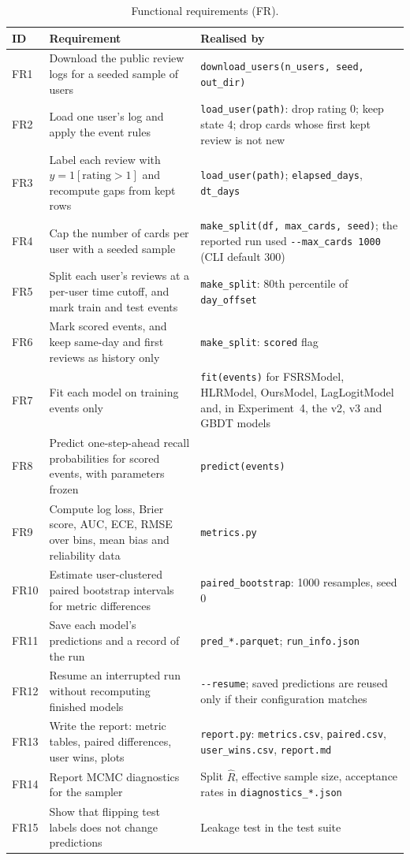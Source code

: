 \begin{table}[!htbp]
  \centering
  \caption{Functional requirements (FR).}
  \label{tab:functional}
  \footnotesize
  \begin{tabular}{@{}p{1.2cm}p{5.3cm}p{7.0cm}@{}}
    \toprule
    ID & Requirement & Realised by \\
    \midrule
    FR1 & Download the public review logs for a seeded sample of users & \texttt{download\_users(n\_users, seed, out\_dir)} \\
    FR2 & Load one user's log and apply the event rules & \texttt{load\_user(path)}: drop rating 0; keep state 4; drop cards whose first kept review is not new \\
    FR3 & Label each review with $y = 1[\text{rating} > 1]$ and recompute gaps from kept rows & \texttt{load\_user(path)}; \texttt{elapsed\_days}, \texttt{dt\_days} \\
    FR4 & Cap the number of cards per user with a seeded sample & \texttt{make\_split(df, max\_cards, seed)}; the reported run used \texttt{-{}-max\_cards 1000} (CLI default 300) \\
    FR5 & Split each user's reviews at a per-user time cutoff, and mark train and test events & \texttt{make\_split}: 80th percentile of \texttt{day\_offset} \\
    FR6 & Mark scored events, and keep same-day and first reviews as history only & \texttt{make\_split}: \texttt{scored} flag \\
    FR7 & Fit each model on training events only & \texttt{fit(events)} for FSRSModel, HLRModel, OursModel, LagLogitModel and, in Experiment~4, the v2, v3 and GBDT models \\
    FR8 & Predict one-step-ahead recall probabilities for scored events, with parameters frozen & \texttt{predict(events)} \\
    FR9 & Compute log loss, Brier score, AUC, ECE, RMSE over bins, mean bias and reliability data & \texttt{metrics.py} \\
    FR10 & Estimate user-clustered paired bootstrap intervals for metric differences & \texttt{paired\_bootstrap}: 1000 resamples, seed 0 \\
    FR11 & Save each model's predictions and a record of the run & \texttt{pred\_*.parquet}; \texttt{run\_\allowbreak info.json} \\
    FR12 & Resume an interrupted run without recomputing finished models & \texttt{-{}-resume}; saved predictions are reused only if their configuration matches \\
    FR13 & Write the report: metric tables, paired differences, user wins, plots & \texttt{report.py}: \texttt{metrics.csv}, \texttt{paired.csv}, \texttt{user\_wins.csv}, \texttt{report.md} \\
    FR14 & Report MCMC diagnostics for the sampler & Split $\hat{R}$, effective sample size, acceptance rates in \texttt{diagnostics\_*.json} \\
    FR15 & Show that flipping test labels does not change predictions & Leakage test in the test suite \\
    \bottomrule
  \end{tabular}
\end{table}

